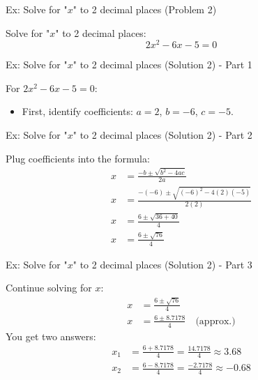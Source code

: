 \documentclass[aspectratio=169]{beamer}
\begin{document}
\begin{frame}{Ex: Solve for "$x$" to 2 decimal places (Problem 2)}
    \begin{tcolorbox}[colback=lightgray,colframe=primary,title=Problem 2]
        \footnotesize
        Solve for "$x$" to 2 decimal places:
        \[ 2x^2 - 6x - 5 = 0 \]
    \end{tcolorbox}
\end{frame}

\begin{frame}{Ex: Solve for "$x$" to 2 decimal places (Solution 2) - Part 1}
    \begin{tcolorbox}[colback=lightgray,colframe=accent,title=Solution 2: Identify Coefficients]
        \footnotesize
        For $2x^2 - 6x - 5 = 0$:
        \begin{itemize}
            \item First, identify coefficients: $a=2$, $b=-6$, $c=-5$.
        \end{itemize}
    \end{tcolorbox}
\end{frame}

\begin{frame}{Ex: Solve for "$x$" to 2 decimal places (Solution 2) - Part 2}
    \begin{tcolorbox}[colback=lightgray,colframe=accent,title=Solution 2: Plug into Formula]
        \footnotesize
        Plug coefficients into the formula:
        \begin{align*}
            x &= \frac{-b \pm \sqrt{b^2 - 4ac}}{2a} \\
            x &= \frac{-(-6) \pm \sqrt{(-6)^2 - 4(2)(-5)}}{2(2)} \\
            x &= \frac{6 \pm \sqrt{36 + 40}}{4} \\
            x &= \frac{6 \pm \sqrt{76}}{4}
        \end{align*}
    \end{tcolorbox}
\end{frame}

\begin{frame}{Ex: Solve for "$x$" to 2 decimal places (Solution 2) - Part 3}
    \begin{tcolorbox}[colback=lightgray,colframe=accent,title=Solution 2: Final Answers]
        \footnotesize
        Continue solving for $x$:
        \begin{align*}
            x &= \frac{6 \pm \sqrt{76}}{4} \\
            x &= \frac{6 \pm 8.7178}{4} \quad \text{(approx.)}
        \end{align*}
        You get two answers:
        \begin{align*}
            x_1 &= \frac{6 + 8.7178}{4} = \frac{14.7178}{4} \approx 3.68 \\
            x_2 &= \frac{6 - 8.7178}{4} = \frac{-2.7178}{4} \approx -0.68
        \end{align*}
    \end{tcolorbox}
\end{frame}
\end{document}
